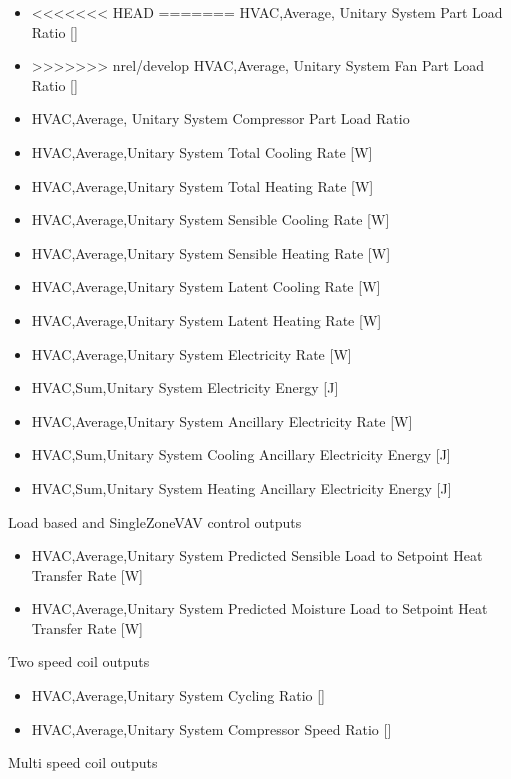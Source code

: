 \begin{itemize}
\item
<<<<<<< HEAD
=======
  HVAC,Average, Unitary System Part Load Ratio {[]}
\item
>>>>>>> nrel/develop
  HVAC,Average, Unitary System Fan Part Load Ratio {[]}
\item
  HVAC,Average, Unitary System Compressor Part Load Ratio
\item
  HVAC,Average,Unitary System Total Cooling Rate {[}W{]}
\item
  HVAC,Average,Unitary System Total Heating Rate {[}W{]}
\item
  HVAC,Average,Unitary System Sensible Cooling Rate {[}W{]}
\item
  HVAC,Average,Unitary System Sensible Heating Rate {[}W{]}
\item
  HVAC,Average,Unitary System Latent Cooling Rate {[}W{]}
\item
  HVAC,Average,Unitary System Latent Heating Rate {[}W{]}
\item
  HVAC,Average,Unitary System Electricity Rate {[}W{]}
\item
  HVAC,Sum,Unitary System Electricity Energy {[}J{]}
\item
  HVAC,Average,Unitary System Ancillary Electricity Rate {[}W{]}
\item
  HVAC,Sum,Unitary System Cooling Ancillary Electricity Energy {[}J{]}
\item
  HVAC,Sum,Unitary System Heating Ancillary Electricity Energy {[}J{]}
\end{itemize}

Load based and SingleZoneVAV control outputs
\begin{itemize}
\tightlist
\item
HVAC,Average,Unitary System Predicted Sensible Load to Setpoint Heat Transfer Rate [W]
\item
HVAC,Average,Unitary System Predicted Moisture Load to Setpoint Heat Transfer Rate [W]
\end{itemize}

Two speed coil outputs

\begin{itemize}
\tightlist
\item
  HVAC,Average,Unitary System Cycling Ratio {[]}
\item
  HVAC,Average,Unitary System Compressor Speed Ratio {[]}
\end{itemize}

Multi speed coil outputs

